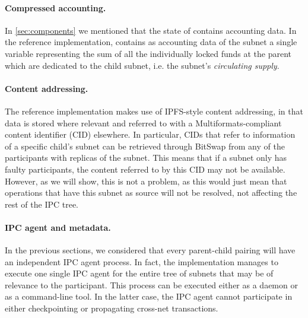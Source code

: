 \paragraph{Compressed accounting.}
In \cref{sec:components} we mentioned that the state of \sa contains accounting data. In the reference implementation, \sa contains as accounting data of the subnet a single variable representing the sum of all the individually locked funds at the parent which are dedicated to the child subnet, i.e. the subnet's \textit{circulating supply}. 

\paragraph{Content addressing.} The reference implementation makes use of IPFS-style content addressing, in that data is stored where relevant and referred to with a Multiformats-compliant content identifier (CID) elsewhere. In particular, CIDs that refer to information of a specific child's subnet can be retrieved through BitSwap from any of the participants with replicas of the subnet. This means that if a subnet only has faulty participants, the content referred to by this CID may not be available. However, as we will show, this is not a problem, as this would just mean that operations that have this subnet as source will not be resolved, not affecting the rest of the IPC tree.   

\paragraph{IPC agent and metadata.} In the previous sections, we considered that every parent-child pairing will have an independent IPC agent process. In fact, the implementation manages to execute one single IPC agent for the entire tree of subnets that may be of relevance to the participant. This process can be executed either as a daemon or as a command-line tool. In the latter case, the IPC agent cannot participate in either checkpointing or propagating cross-net transactions. 


